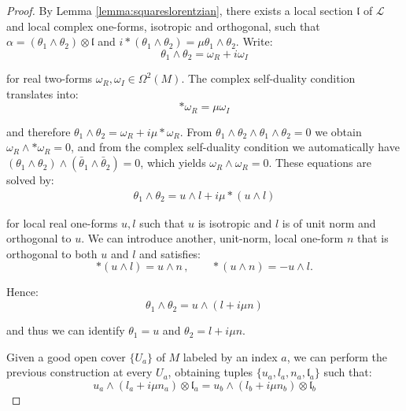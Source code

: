 \documentclass[10pt,a4paper,twoside,reqno]{amsart}
\theoremstyle{plain}
\theoremstyle{definition}
\theoremstyle{remark}
\def\cL{\mathcal{L}}
\begin{document}
\begin{proof}
By Lemma \ref{lemma:squareslorentzian}, there exists a local section $\mathfrak{l}$ of $\cL$ and local complex one-forms, isotropic and orthogonal, such that $\alpha = (\theta_1\wedge \theta_2) \otimes \mathfrak{l}$ and $i\ast (\theta_1\wedge \theta_2 ) = \mu \theta_1\wedge \theta_2$. Write:
\begin{equation*}
\theta_1\wedge \theta_2  = \omega_R + i \omega_I
\end{equation*}

\noindent
for real two-forms $\omega_R , \omega_I \in \Omega^2(M)$. The complex self-duality condition translates into:
\begin{equation*}
\ast\omega_R = \mu \omega_I
\end{equation*}

\noindent
and therefore $\theta_1\wedge\theta_2 = \omega_R + i\mu\ast\omega_R$. From $\theta_1\wedge\theta_2\wedge\theta_1\wedge\theta_2=0$ we obtain $\omega_R\wedge \ast\omega_R = 0$, and from the complex self-duality condition we automatically have $(\theta_1\wedge\theta_2)\wedge(\bar{\theta}_1\wedge\bar{\theta}_2)=0$, which yields $\omega_R \wedge \omega_R = 0$. These equations are solved by: 
\begin{eqnarray*}
\theta_1\wedge \theta_2  = u\wedge l + i\mu \ast(u\wedge l)
\end{eqnarray*}

\noindent
for local real one-forms $u,l$ such that $u$ is isotropic and $l$ is of unit norm and orthogonal to $u$. We can introduce another, unit-norm, local one-form $n$ that is orthogonal to both $u$ and $l$ and satisfies:
\begin{equation*}
\ast(u\wedge l) = u\wedge n \, , \qquad \ast(u\wedge n) = - u\wedge l.
\end{equation*}

\noindent
Hence:
\begin{equation*}
\theta_1\wedge \theta_2  = u\wedge (l + i\mu n)
\end{equation*}

\noindent
and thus we can identify $\theta_1 = u$ and $\theta_2 = l+i\mu n$.\medskip
 
Given a good open cover $\{U_a\}$ of $M$ labeled by an index $a$, we can perform the previous construction at every $U_a$, obtaining tuples $\{u_a,l_a,n_a,\mathfrak{l}_a\}$ such that:
\begin{equation*}
u_a \wedge (l_a + i\mu n_a) \otimes \mathfrak{l}_a = u_b \wedge (l_b + i\mu n_b) \otimes \mathfrak{l}_b
\end{equation*}
 

\end{proof}
\end{document}
